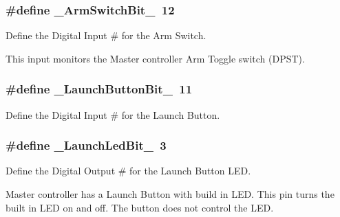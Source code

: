 \subsubsection[{\texorpdfstring{\+\_\+\+Arm\+Switch\+Bit\+\_\+}{\_ArmSwitchBit\_}}]{\setlength{\rightskip}{0pt plus 5cm}\#define \+\_\+\+Arm\+Switch\+Bit\+\_\+~12}\hypertarget{masterPanel_8ino_aceced00e366c0b2de5b1f6a45e857af2}{}\label{masterPanel_8ino_aceced00e366c0b2de5b1f6a45e857af2}


Define the Digital Input \# for the Arm Switch. 

This input monitors the Master controller Arm Toggle switch (D\+P\+ST). 
\subsubsection[{\texorpdfstring{\+\_\+\+Launch\+Button\+Bit\+\_\+}{\_LaunchButtonBit\_}}]{\setlength{\rightskip}{0pt plus 5cm}\#define \+\_\+\+Launch\+Button\+Bit\+\_\+~11}\hypertarget{masterPanel_8ino_a7790df90c3031037ccd5b55d84e32858}{}\label{masterPanel_8ino_a7790df90c3031037ccd5b55d84e32858}


Define the Digital Input \# for the Launch Button. 

\subsubsection[{\texorpdfstring{\+\_\+\+Launch\+Led\+Bit\+\_\+}{\_LaunchLedBit\_}}]{\setlength{\rightskip}{0pt plus 5cm}\#define \+\_\+\+Launch\+Led\+Bit\+\_\+~3}\hypertarget{masterPanel_8ino_a556344e1154b17e67f5c8a40e022be29}{}\label{masterPanel_8ino_a556344e1154b17e67f5c8a40e022be29}


Define the Digital Output \# for the Launch Button L\+ED. 

Master controller has a Launch Button with build in L\+ED. This pin turns the built in L\+ED on and off. The button does not control the L\+ED. 
